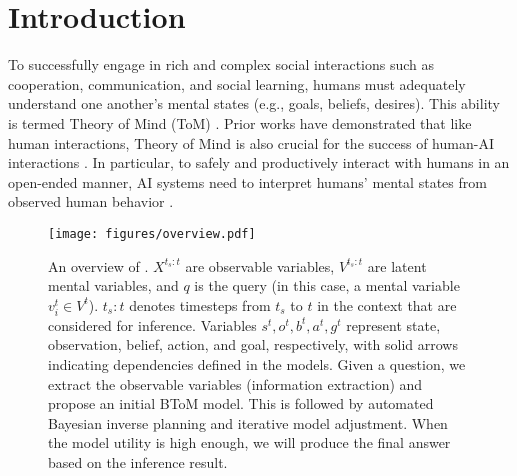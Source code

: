 \section{Introduction}

To successfully engage in rich and complex social interactions such as cooperation, communication, and social learning, humans must adequately understand one another's mental states (e.g., goals, beliefs, desires). This ability is termed Theory of Mind (ToM) \cite{wimmer1983beliefs}. Prior works have demonstrated that like human interactions, Theory of Mind is also crucial for the success of human-AI interactions  \citep[e.g.,][]{dautenhahn2007socially, hadfield2016cooperative,liu2018goal}. In particular, to safely and productively interact with humans in an open-ended manner, AI systems need to interpret humans' mental states from observed human behavior \citep[e.g.,][]{chandra2020stylepredict,wang2021towards, wan2022handmethat,patel2022proactive,puig2023nopa,zhi2024pragmatic,ying2024goma}. 


\begin{figure*}[ht]
  \centering
  \texttt{[image: figures/overview.pdf]}
    \vspace{-15pt}
  \caption{An overview of \ours. $X^{t_s:t}$ are observable variables, $V^{t_s:t}$ are latent mental variables, and $q$ is the query (in this case, a mental variable $v_i^t \in V^{t}$). $t_s:t$ denotes timesteps from $t_s$ to $t$ in the context that are considered for inference. Variables $s^t, o^t, b^t, a^t, g^t$ represent state, observation, belief, action, and goal, respectively, with solid arrows indicating dependencies defined in the models. Given a question, we extract the observable variables (information extraction) and propose an initial BToM model. This is followed by automated Bayesian inverse planning and iterative model adjustment. When the model utility is high enough, we will produce the final answer based on the inference result.}
  \label{fig:overview}
  \vspace{-10pt}
\end{figure*}

